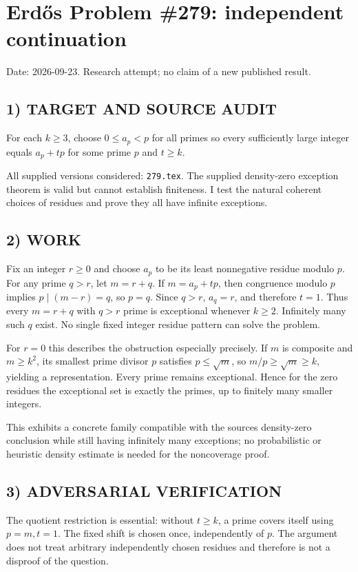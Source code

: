 \section{Erd\H{o}s Problem \#279: independent continuation}
\noindent Date: 2026-09-23. Research attempt; no claim of a new published result.
\subsection{1) TARGET AND SOURCE AUDIT}
For each $k\ge3$, choose $0\le a_p<p$ for all primes so every sufficiently large integer equals $a_p+tp$ for some prime $p$ and $t\ge k$.

All supplied versions considered: \texttt{279.tex}.
The supplied density-zero exception theorem is valid but cannot establish finiteness. I test the natural coherent choices of residues and prove they all have infinite exceptions.
\subsection{2) WORK}
Fix an integer $r\ge0$ and choose $a_p$ to be its least nonnegative residue modulo $p$. For any prime $q>r$, let $m=r+q$. If $m=a_p+tp$, then congruence modulo $p$ implies $p\mid(m-r)=q$, so $p=q$. Since $q>r$, $a_q=r$, and therefore $t=1$. Thus every $m=r+q$ with $q>r$ prime is exceptional whenever $k\ge2$. Infinitely many such $q$ exist. No single fixed integer residue pattern can solve the problem.

For $r=0$ this describes the obstruction especially precisely. If $m$ is composite and $m\ge k^2$, its smallest prime divisor $p$ satisfies $p\le\sqrt m$, so $m/p\ge\sqrt m\ge k$, yielding a representation. Every prime remains exceptional. Hence for the zero residues the exceptional set is exactly the primes, up to finitely many smaller integers.

This exhibits a concrete family compatible with the source\textquotesingle s density-zero conclusion while still having infinitely many exceptions; no probabilistic or heuristic density estimate is needed for the noncoverage proof.
\subsection{3) ADVERSARIAL VERIFICATION}
The quotient restriction is essential: without $t\ge k$, a prime covers itself using $p=m,t=1$. The fixed shift is chosen once, independently of $p$. The argument does not treat arbitrary independently chosen residues and therefore is not a disproof of the question.
